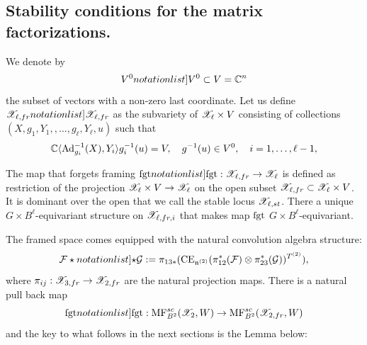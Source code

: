 

 \subsection{Stability conditions for the matrix factorizations.}

 We denote by \[\SymbolPrint{V^0}\subset V=\CC^n \] the subset of vectors with a non-zero last coordinate.
 Let us define $\SymbolPrint{\calX_{\ell,fr}}$ as the subvariety  of  $\mathscr{X}_\ell\times V$ consisting of collections
 \( (X,g_1,Y_1,,\dots,g_\ell,Y_\ell,u)\) such that
\[\mathbb{C} \langle {\rm Ad}_{g_i}^{-1}(X),Y_i\rangle g^{-1}_i(u)=V,\quad g^{-1}(u)\in V^0,\quad i=1,\dots,\ell-1,\]

The map that forgets framing  $\SymbolPrint{\forg }:\calX_{\ell,fr}\to \calX_\ell$  is defined as restriction of the projection \(\mathscr{X}_\ell\times V\rightarrow \mathscr{X}_\ell\) on the
open subset \(\mathscr{X}_{\ell,fr}\subset\mathscr{X}_\ell\times V\). It
is dominant over the open that we call
the stable locus $\mathscr{X}_{\ell,st}$. There a unique $G\times B^\ell$-equivariant structure on $\mathscr{X}_{\ell,fr,i}$ that makes map $\mathrm{fgt}$ $G\times B^\ell$-equivariant.


The framed space comes equipped with the natural convolution algebra structure:
$$ \calF\SymbolPrint{\star} \calG:=\pi_{13*}(\CE_{\frn^{(2)}}(\pi_{12}^*(\calF)\otimes\pi_{23}^*(\calG))^{T^{(2)}}),$$
where $\pi_{ij}:\mathscr{X}_{3,fr}\to \mathscr{X}_{2,fr}$ are the natural projection maps.
There is a natural pull back map \[\SymbolPrint{\forg}: \MF_{B^2}(\calX_2,W)\to \MF_{B^2}(\calX_{2,fr},W)\] and the key to what follows in the next sections is the Lemma below:


